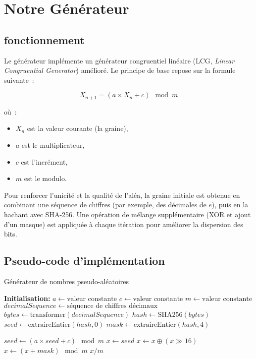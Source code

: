\section{Notre Générateur}

\subsection{fonctionnement}

Le générateur implémente un générateur congruentiel linéaire (LCG, \emph{Linear Congruential Generator}) amélioré. Le principe de base repose sur la formule suivante~:

\begin{equation}
    X_{n+1} = (a \times X_n + c) \mod m
\end{equation}

où~:
\begin{itemize}
    \item $X_n$ est la valeur courante (la graine),
    \item $a$ est le multiplicateur,
    \item $c$ est l'incrément,
    \item $m$ est le modulo.
\end{itemize}

Pour renforcer l'unicité et la qualité de l'aléa, la graine initiale est obtenue en combinant une séquence de chiffres (par exemple, des décimales de $e$), puis en la hachant avec SHA-256. Une opération de mélange supplémentaire (XOR et ajout d'un masque) est appliquée à chaque itération pour améliorer la dispersion des bits.

\subsection{Pseudo-code d’implémentation}
\begin{algorithm}
\caption{Générateur de nombres pseudo-aléatoires}
\begin{algorithmic}[1]
\State \textbf{Initialisation:}
\State $a \gets \text{valeur constante}$ 
\State $c \gets \text{valeur constante}$ 
\State $m \gets \text{valeur constante}$ 
\State $decimalSequence \gets \text{séquence de chiffres décimaux}$
\State $bytes \gets \text{transformer}(decimalSequence)$ 
\State $hash \gets \text{SHA256}(bytes)$
\State $seed \gets \text{extraireEntier}(hash, 0)$ 
\State $mask \gets \text{extraireEntier}(hash, 4)$ 

\State
{}
    \State $seed \gets (a \times seed + c) \mod m$
    \State $x \gets seed$
    \State $x \gets x \oplus (x \gg 16)$ 
    \State $x \gets (x + mask) \mod m$
    \State \Return $x / m$ 
\EndFunction
\end{algorithmic}
\end{algorithm}



\clearpage